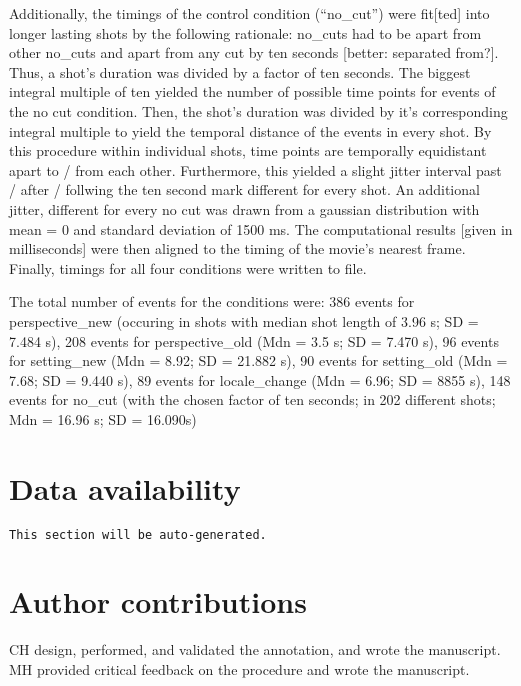 \documentclass[10pt,a4paper,twocolumn]{article}
\begin{document}
Additionally, the timings of the control condition (``no\_cut'')
were fit{[}ted{]} into longer lasting shots by the following rationale:
no\_cuts had to be apart from other no\_cuts and apart from any cut
by ten seconds {[}better: separated from?{]}. Thus, a shot's duration
was divided by a factor of ten seconds. The biggest integral multiple
of ten yielded the number of possible time points for events of the
no cut condition. Then, the shot's duration was divided by it's corresponding
integral multiple to yield the temporal distance of the events in
every shot. By this procedure within individual shots, time points
are temporally equidistant apart to / from each other. Furthermore,
this yielded a slight jitter interval past / after / follwing the
ten second mark different for every shot. An additional jitter, different
for every no cut was drawn from a gaussian distribution with mean
= 0 and standard deviation of 1500 ms. The computational results {[}given
in milliseconds{]} were then aligned to the timing of the movie's
nearest frame. Finally, timings for all four conditions were written
to file. 

The total number of events for the conditions were: 386 events for
perspective\_new (occuring in shots with median shot length of 3.96
s; SD = 7.484 s), 208 events for perspective\_old (Mdn = 3.5 s; SD
= 7.470 s), 96 events for setting\_new (Mdn = 8.92; SD = 21.882 s),
90 events for setting\_old (Mdn = 7.68; SD = 9.440 s), 89 events for
locale\_change (Mdn = 6.96; SD = 8855 s), 148 events for no\_cut (with
the chosen factor of ten seconds; in 202 different shots; Mdn = 16.96
s; SD = 16.090s)


\section*{Data availability}

\texttt{This section will be auto-generated.}


\section*{Author contributions}
CH design, performed, and validated the annotation, and wrote the manuscript.
MH provided critical feedback on the procedure and wrote the manuscript.
\end{document}
